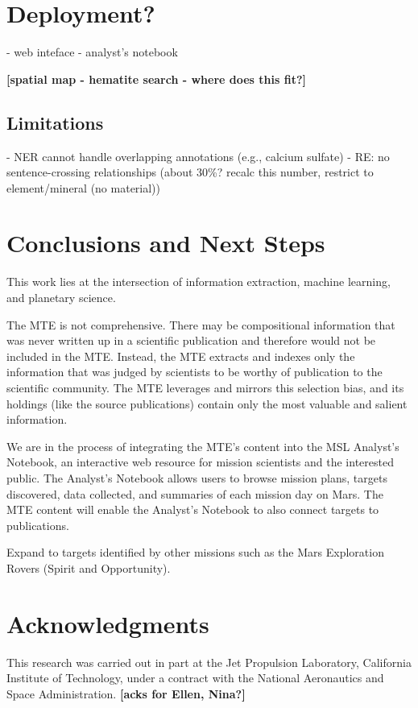 \documentclass[letterpaper]{article} %
\begin{document}
\section{Deployment?}
- web inteface
- analyst's notebook

{\bf [spatial map - hematite search - where does this fit?]}

\subsection{Limitations}
- NER cannot handle overlapping annotations (e.g., calcium sulfate)
- RE: no sentence-crossing relationships (about 30\%? recalc this
  number, restrict to element/mineral (no material))

\section{Conclusions and Next Steps}

This work lies at the intersection of information extraction, machine
learning, and planetary science.  

The MTE is not comprehensive.  There may be compositional information
that was never written up in a scientific publication and therefore
would not be included in the MTE.  Instead, the MTE extracts and
indexes only the information that was judged by scientists to be
worthy of publication to the scientific community.  The MTE leverages
and mirrors this selection bias, and its holdings (like the source
publications) contain only the most valuable and salient information.

We are in the process of integrating the MTE's content into the MSL
Analyst's Notebook, an interactive web resource for mission scientists
and the interested public.  The Analyst's Notebook allows users to
browse mission plans, targets discovered, data collected, and
summaries of each mission day on Mars.  The MTE content will enable
the Analyst's Notebook to also connect targets to publications.

Expand to targets identified by other missions such as the Mars
Exploration Rovers (Spirit and Opportunity).

\section{Acknowledgments}
This research was carried out in part at the Jet Propulsion Laboratory,
California Institute of Technology, under a contract with the National
Aeronautics and Space Administration.  {\bf [acks for Ellen, Nina?]}



\end{document}
